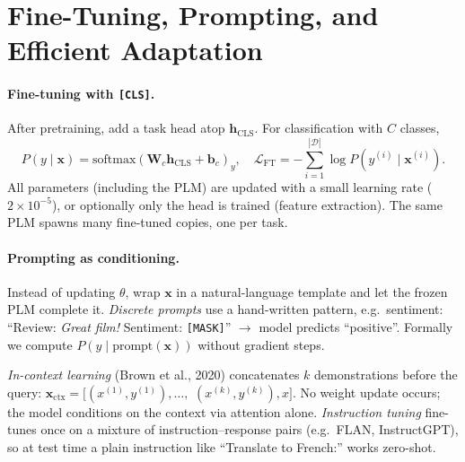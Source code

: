 \section{Fine-Tuning, Prompting, and Efficient Adaptation}
\label{sec:adaptation}
\paragraph{Fine-tuning with \texttt{[CLS]}.} After pretraining, add a task head atop $\mathbf{h}_{\text{CLS}}$. For classification with $C$ classes,
\begin{equation}
P(y\mid\mathbf{x})=\mathrm{softmax}(\mathbf{W}_c\mathbf{h}_{\text{CLS}}+\mathbf{b}_c)_y,\quad
\mathcal{L}_{\text{FT}}=-\sum_{i=1}^{|\mathcal{D}|}\log P(y^{(i)}\mid\mathbf{x}^{(i)}).
\label{eq:finetune}
\end{equation}
All parameters (including the PLM) are updated with a small learning rate ($2{\times}10^{-5}$), or optionally only the head is trained (feature extraction). The same PLM spawns many fine-tuned copies, one per task.

\paragraph{Prompting as conditioning.} Instead of updating $\theta$, wrap $\mathbf{x}$ in a natural-language template and let the frozen PLM complete it. \emph{Discrete prompts} use a hand-written pattern, e.g.\ sentiment: ``Review: \textit{Great film!} Sentiment: \texttt{[MASK]}'' $\to$ model predicts ``positive''. Formally we compute $P(y\mid\text{prompt}(\mathbf{x}))$ without gradient steps.

\emph{In-context learning} (Brown et al., 2020) concatenates $k$ demonstrations
before the query: $\mathbf{x}_{\text{ctx}}=[(x^{(1)},y^{(1)}),\dots,$
$(x^{(k)},y^{(k)}),x]$.
No weight update occurs; the model conditions on the context via attention alone. \emph{Instruction tuning} fine-tunes once on a mixture of instruction--response pairs (e.g.\ FLAN, InstructGPT), so at test time a plain instruction like ``Translate to French:'' works zero-shot.

